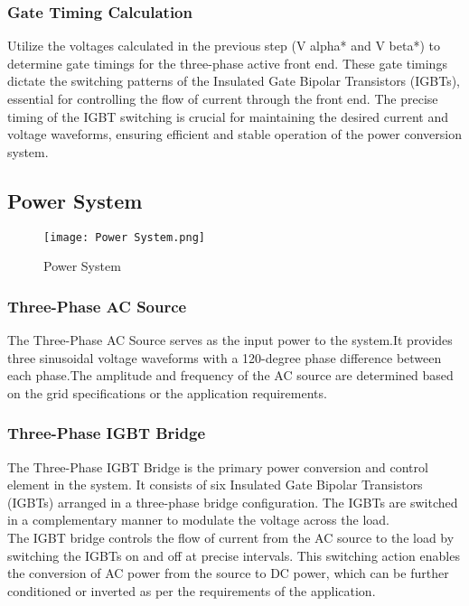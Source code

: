 \subsubsection{Gate Timing Calculation}
Utilize the voltages calculated in the previous step (V alpha* and V beta*) to
determine gate timings for the three-phase active front end. These gate timings
dictate the switching patterns of the Insulated Gate Bipolar Transistors
(IGBTs), essential for controlling the flow of current through the front end.
The precise timing of the IGBT switching is crucial for maintaining the desired
current and voltage waveforms, ensuring efficient and stable operation of the
power conversion system.

\subsection{Power System}
\begin{figure}[h]
    \centering
    \texttt{[image: Power System.png]}
    \caption{Power System}
    \label{fig:Power System}
\end{figure}

\subsubsection{Three-Phase AC Source}
The Three-Phase AC Source serves as the input power to the system.It provides
three sinusoidal voltage waveforms with a 120-degree phase difference between
each phase.The amplitude and frequency of the AC source are determined based on
the grid specifications or the application requirements.
\subsubsection{Three-Phase IGBT Bridge}
The Three-Phase IGBT Bridge is the primary power conversion and control element
in the system. It consists of six Insulated Gate Bipolar Transistors (IGBTs)
arranged in a three-phase bridge configuration. The IGBTs are switched in a
complementary manner to modulate the voltage across the load.\\

The IGBT bridge controls the flow of current from the AC source to the load by
switching the IGBTs on and off at precise intervals. This switching action
enables the conversion of AC power from the source to DC power, which can be
further conditioned or inverted as per the requirements of the application.\\


